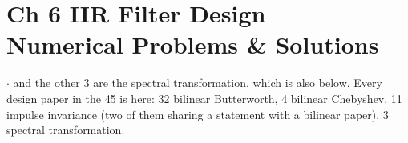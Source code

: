 \section*{\color{acc}Ch 6 \textperiodcentered{} IIR Filter Design\\[2pt]
{\large\textcolor{sub}{Numerical Problems \& Solutions}}}
\vspace{-4pt}{\color{acc}\rule{\textwidth}{1.1pt}}\vspace{4pt}

{\color{sub}\footnotesize {} \gap$\cdot$\gap {} and
the other 3 are the spectral transformation, which is also below. Every design paper in
the 45 is here: 32 bilinear Butterworth, 4 bilinear Chebyshev, 11 impulse invariance
(two of them sharing a statement with a bilinear paper), 3 spectral transformation.}

